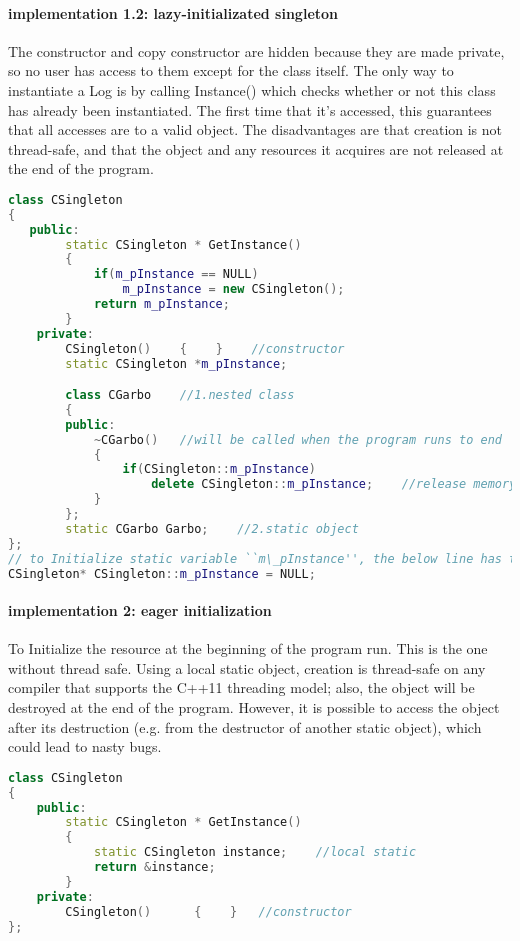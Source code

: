\documentclass{book}
\begin{document}
\paragraph{implementation 1.2: lazy-initializated singleton}
The constructor and copy constructor are hidden because they are made private, so no user has access to them except for the class itself.
The only way to instantiate a Log is by calling Instance() which checks whether or not this class has already been instantiated.
The first time that it's accessed, this guarantees that all accesses are to a valid object.
The disadvantages are that creation is not thread-safe, and that the object and any resources it acquires are not released at the end of the program.
\begin{lstlisting}[caption={sample code 1.2: lazy},language=C++]
class CSingleton    
{    
   public:    
        static CSingleton * GetInstance()    
        {    
            if(m_pInstance == NULL)    
                m_pInstance = new CSingleton();    
            return m_pInstance;    
        }    
    private:    
        CSingleton()    {    }    //constructor
        static CSingleton *m_pInstance;    

        class CGarbo    //1.nested class 
        {    
        public:    
            ~CGarbo()   //will be called when the program runs to end 
            {    
                if(CSingleton::m_pInstance)    
                    delete CSingleton::m_pInstance;    //release memory
            }    
        };    
        static CGarbo Garbo;    //2.static object 
};    
// to Initialize static variable ``m\_pInstance'', the below line has to be added into the corresponding cpp file like, 
CSingleton* CSingleton::m_pInstance = NULL;
\end{lstlisting}

\paragraph{implementation 2: eager initialization}
To Initialize the resource at the beginning of the program run. This is the one without thread safe.
Using a local static object, creation is thread-safe on any compiler that supports the C++11 threading model;
also, the object will be destroyed at the end of the program.
However, it is possible to access the object after its destruction (e.g. from the destructor of another static object), which could lead to nasty bugs.
\begin{lstlisting}[caption={sample code 1.2: eager initialization},language=C++]
class CSingleton    
{    
    public:    
        static CSingleton * GetInstance()    
        {    
            static CSingleton instance;    //local static 
            return &instance;    
        }    
    private:    
        CSingleton()      {    }   //constructor 
};    
\end{lstlisting}
\end{document}
